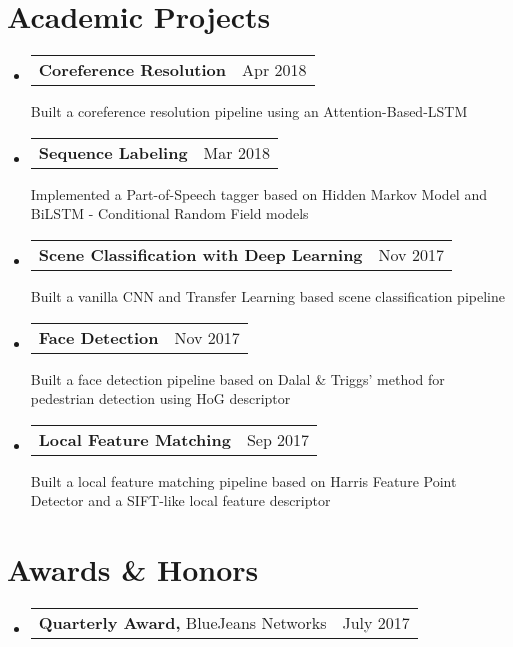 \documentclass[letterpaper,11pt]{article}
\makeatletter
\newcommand{\teachingExperienceRow}[2]{
  \vspace{-1pt}\item[]
    \begin{tabular*}{0.97\textwidth}{l@{\extracolsep{\fill}}r}
    \small{#1} & \small{#2}
    \end{tabular*}\vspace{-7pt}
}
\newcommand{\resumeSubItem}[3]{
  \vspace{-1pt}\item[]
    \begin{tabular*}{0.97\textwidth}{l@{\extracolsep{\fill}}r}
      \textbf{\small#1} & {\small#2}
    \end{tabular*}
    {\small#3}\vspace{-5pt}
}
\newcommand{\resumeSubHeadingListStart}{\begin{itemize}[label={}, leftmargin=*]}
\newcommand{\resumeSubHeadingListEnd}{\end{itemize}}
\makeatother
\begin{document}
\section{Academic Projects}
  \resumeSubHeadingListStart  	
	\resumeSubItem{Coreference Resolution}{Apr 2018}{Built a coreference resolution pipeline using an Attention-Based-LSTM}
	\resumeSubItem{Sequence Labeling}{Mar 2018}{Implemented a Part-of-Speech tagger based on Hidden Markov Model and BiLSTM - Conditional Random Field models}
    \resumeSubItem{Scene Classification with Deep Learning}{Nov 2017}{Built a vanilla CNN and Transfer Learning based scene classification pipeline}
    \resumeSubItem{Face Detection}{Nov 2017} {Built a face detection pipeline based on Dalal \& Triggs’ method for pedestrian detection using HoG descriptor}
    \resumeSubItem{Local Feature Matching}{Sep 2017} {Built a local feature matching pipeline based on Harris Feature Point Detector and a SIFT-like local feature descriptor}
  \resumeSubHeadingListEnd

\vspace{-7pt}
\section{Awards \& Honors}
  \vspace{-2pt} \resumeSubHeadingListStart
   \teachingExperienceRow {\textbf{Quarterly Award,} BlueJeans Networks}{July 2017}
   \resumeSubHeadingListEnd

\end{document}
